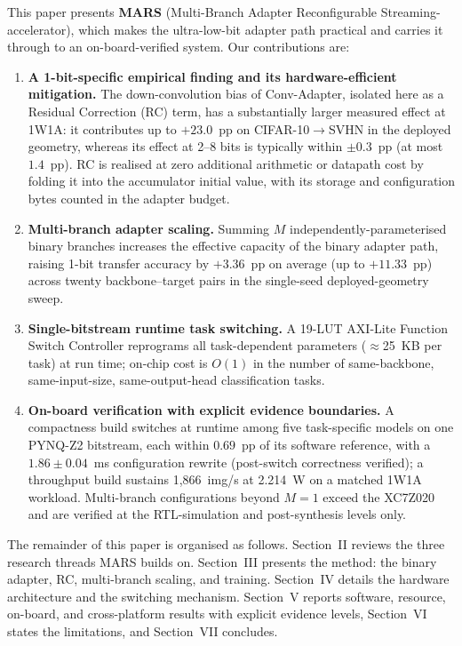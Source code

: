 \documentclass[journal]{IEEEtran}
\begin{document}
This paper presents \textbf{MARS} (Multi-Branch Adapter Reconfigurable Streaming-accelerator), which makes the ultra-low-bit adapter path practical and carries it through to an on-board-verified system. Our contributions are:
\begin{enumerate}
\item \textbf{A 1-bit-specific empirical finding and its hardware-efficient mitigation.} The down-convolution bias of Conv-Adapter, isolated here as a Residual Correction (RC) term, has a substantially larger measured effect at 1W1A: it contributes up to $+23.0$~pp on CIFAR-10$\to$SVHN in the deployed geometry, whereas its effect at 2--8 bits is typically within $\pm 0.3$~pp (at most $1.4$~pp). RC is realised at zero additional arithmetic or datapath cost by folding it into the accumulator initial value, with its storage and configuration bytes counted in the adapter budget.
\item \textbf{Multi-branch adapter scaling.} Summing $M$ independently-parameterised binary branches increases the effective capacity of the binary adapter path, raising 1-bit transfer accuracy by $+3.36$~pp on average (up to $+11.33$~pp) across twenty backbone--target pairs in the single-seed deployed-geometry sweep.
\item \textbf{Single-bitstream runtime task switching.} A 19-LUT AXI-Lite Function Switch Controller reprograms all task-dependent parameters ($\approx$25~KB per task) at run time; on-chip cost is $O(1)$ in the number of same-backbone, same-input-size, same-output-head classification tasks.
\item \textbf{On-board verification with explicit evidence boundaries.} A compactness build switches at runtime among five task-specific models on one PYNQ-Z2 bitstream, each within $0.69$~pp of its software reference, with a $1.86\pm0.04$~ms configuration rewrite (post-switch correctness verified); a throughput build sustains 1{,}866~img/s at 2.214~W on a matched 1W1A workload. Multi-branch configurations beyond $M{=}1$ exceed the XC7Z020 and are verified at the RTL-simulation and post-synthesis levels only.
\end{enumerate}

The remainder of this paper is organised as follows. Section~II reviews the three research threads MARS builds on. Section~III presents the method: the binary adapter, RC, multi-branch scaling, and training. Section~IV details the hardware architecture and the switching mechanism. Section~V reports software, resource, on-board, and cross-platform results with explicit evidence levels, Section~VI states the limitations, and Section~VII concludes.
\end{document}
